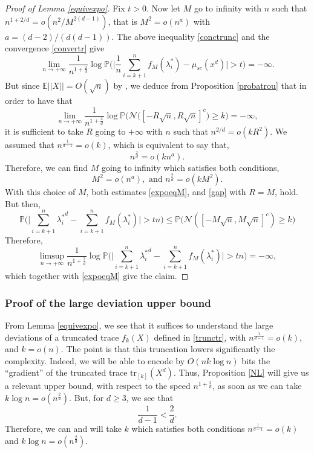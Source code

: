 \documentclass[aop,preprint]{imsart}
\newcommand\PP{\mathbb{P}}
\newcommand\EE{\mathbb{E}}
\newcommand\tr{\mathrm{tr}}
\numberwithin{equation}{section}
\theoremstyle{definition}
\theoremstyle{plain}
\theoremstyle{remark}
\begin{document}
\begin{proof}[Proof of Lemma \ref{equivexpo}]
Fix $t>0$. Now let $M$ go to infinity with $n$ such that $n^{1+2/d} = o(n^2/M^{2(d-1)})$, that is $M^2 =o(n^{a})$ with $a = (d-2)/(d(d-1))$. The above inequality \eqref{conctrunc} and the convergence \eqref{convertr} give 
\begin{equation} \label{expoeqM} \lim_{n\to +\infty} \frac{1}{n^{1+\frac{2}{d}}} \log  \PP\Big(\big | \frac{1}{n}\sum_{i=k+1}^{n} f_M(\lambda_i^*)  - \mu_{sc}(x^d) \big| >t \Big)  = -\infty.\end{equation}
But since  $\EE || X || =O(\sqrt{n})$ by \cite[Exercice 2.1.29]{AGZ}, we deduce from Proposition \ref{probatrou} that in order to have that 
\begin{equation} \label{gap} \lim_{n\to +\infty} \frac{1}{n^{1+\frac{2}{d}}} \log  \PP\Big(\mathcal{N}\big([-R\sqrt{n},R\sqrt{n}]^c\big)\geq k \Big)  = -\infty,\end{equation}
it is sufficient to take $R$ going to $+\infty$ with $n$ such that $n^{2/d} = o(kR^2)$. We assumed that $n^{\frac{1}{d-1}} = o(k)$, which is equivalent to say that,
$$n^{\frac{2}{d}} = o(kn^a).$$ 
Therefore, we can find $M$ going to infinity which satisfies both conditions,
$$ M^2 = o(n^a), \text{ and } n^{\frac{2}{d}} = o(kM^2).$$
With this choice of $M$, both estimates \eqref{expoeqM}, and \eqref{gap} with $R=M$, hold.
 But then,
$$\PP \Big( \big| \sum_{i=k+1}^n {\lambda_i^*}^d - \sum_{i=k+1}^n f_M(\lambda_i^*)  \big| > t n \Big) \leq \PP\Big(\mathcal{N}([-M\sqrt{n},M\sqrt{n}]^c)\geq k \Big) $$
Therefore, 
$$\limsup_{n\to +\infty} \frac{1}{n^{1+\frac{2}{d}}} \log \PP \Big( \big| \sum_{i=k+1}^n {\lambda_i^*}^d - \sum_{i=k+1}^n f_M(\lambda_i^*)  \big| > t n \Big)=-\infty,$$
which together with \eqref{expoeqM} give the claim.


\end{proof}




\subsubsection{Proof of the large deviation upper bound}\label{lbtr}

From Lemma \ref{equivexpo}, we see that it suffices to understand the large deviations of a truncated trace $f_{k}(X)$ defined in \eqref{trunctr}, with $n^{\frac{1}{d-1}} = o(k)$, and $k=o(n)$. The point is that this truncation lowers significantly the complexity. Indeed, we will be able to encode by $O(nk\log n)$ bits the ``gradient'' of the truncated trace $\tr_{[k]}(X^d)$. Thus, Proposition \ref{NL} will give us a relevant upper bound, with respect to the speed $n^{1+\frac{2}{d}}$, as soon as we can take $k\log n = o(n^{\frac{2}{d}})$. But, for $d\geq 3$, we see that
$$ \frac{1}{d-1} < \frac{2}{d}.$$
Therefore, we can and will take $k$ which satisfies both conditions $n^{\frac{1}{d-1}} = o(k)$ and $k\log n =o(n^{\frac{2}{d}})$.
\end{document}

